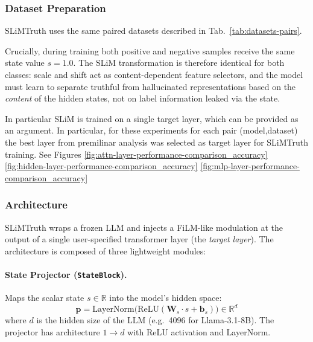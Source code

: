\subsubsection{Dataset Preparation}

SLiMTruth uses the same paired datasets described in Tab.~\ref{tab:datasets-pairs}.

\noindent Crucially, during training both positive and negative samples receive the same state value $s = 1.0$. The SLiM transformation is therefore identical for both classes: scale and shift act as content-dependent feature selectors, and the model must learn to separate truthful from hallucinated representations based on the \textit{content} of the hidden states, not on label information leaked via the state.

In particular SLiM is trained on a single target layer, which can be provided as an argument. In particular, for these experiments for each pair (model,dataset) the best layer from premilinar analysis was selected as target layer for SLiMTruth training. See Figures 
\ref{fig:attn-layer-performance-comparison_accuracy}
\ref{fig:hidden-layer-performance-comparison_accuracy}
\ref{fig:mlp-layer-performance-comparison_accuracy}
\subsubsection{Architecture}

SLiMTruth wraps a frozen LLM and injects a FiLM-like modulation at the output of a single user-specified transformer layer (the \textit{target layer}). The architecture is composed of three lightweight modules:

\paragraph{State Projector (\texttt{StateBlock}).}
Maps the scalar state $s \in \mathbb{R}$ into the model's hidden space:
\begin{equation}
\label{eq:slim_state}
\mathbf{p} = \mathrm{LayerNorm}\!\big(\mathrm{ReLU}(\mathbf{W}_s \cdot s + \mathbf{b}_s)\big) \in \mathbb{R}^{d}
\end{equation}
where $d$ is the hidden size of the LLM (e.g.\ 4096 for Llama-3.1-8B). The projector has architecture $1 \to d$ with ReLU activation and LayerNorm.

